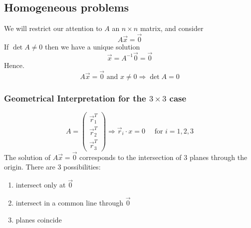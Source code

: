 \documentclass{article}
\numberwithin{equation}{section}
\begin{document}
\subsection{Homogeneous problems}
We will restrict our attention to $A$ an $n \times n$ matrix, and consider
\[
    A \vec x = \vec 0  
\]
If $\det A \neq 0$ then we have a unique solution
\[
    \vec x = A^{-1} \vec 0 = \vec 0   
\]
Hence. 
\[
    A \vec x = \vec 0 \text{ and } x \neq 0 \Rightarrow \det A = 0
\]

\subsubsection{Geometrical Interpretation for the $3 \times 3$ case}
\[
    A = \begin{pmatrix}
        \vec r_1^T \\[10pt]
        \vec r_2^T \\[10pt]
        \vec r_3^T
    \end{pmatrix} 
    \Rightarrow \vec r_i \cdot x = 0 \quad \text{ for } i = 1, 2, 3
\]
The solution of $A \vec x = \vec 0$ corresponds to the intersection of $3$ planes through the origin.
There are 3 possibilities:
\begin{enumerate}
    \item intersect only at $\vec 0$
    \item intersect in a common line through $\vec 0$
    \item planes coincide
\end{enumerate}
\end{document}
